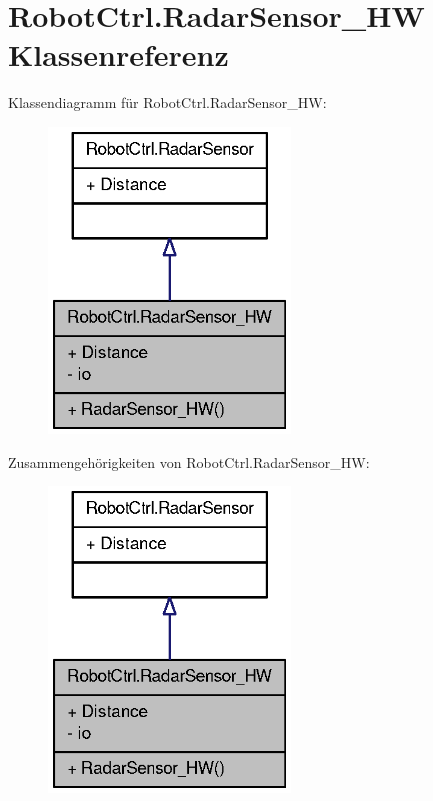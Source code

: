 \hypertarget{class_robot_ctrl_1_1_radar_sensor___h_w}{
\section{RobotCtrl.RadarSensor\_\-HW Klassenreferenz}
\label{class_robot_ctrl_1_1_radar_sensor___h_w}
}


Klassendiagramm für RobotCtrl.RadarSensor\_\-HW:\nopagebreak
\begin{figure}[H]
\begin{center}
\leavevmode
\includegraphics[width=182pt]{class_robot_ctrl_1_1_radar_sensor___h_w__inherit__graph}
\end{center}
\end{figure}


Zusammengehörigkeiten von RobotCtrl.RadarSensor\_\-HW:\nopagebreak
\begin{figure}[H]
\begin{center}
\leavevmode
\includegraphics[width=182pt]{class_robot_ctrl_1_1_radar_sensor___h_w__coll__graph}
\end{center}
\end{figure}
